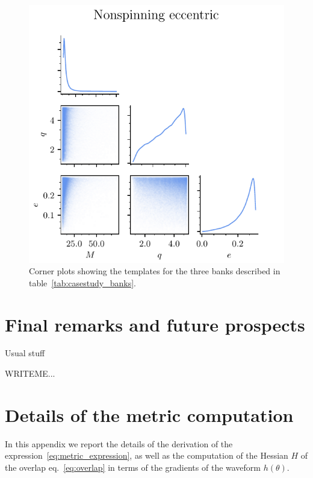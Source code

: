 \documentclass[twocolumn,showpacs,preprintnumbers,nofootinbib,prd,
superscriptaddress,10pt]{revtex4-2}
\begin{document}
\begin{figure}[t]
	\includegraphics{bank_scatter_Nonspinning_eccentric}
	\caption{Corner plots showing the templates for the three banks described in table~\ref{tab:casestudy_banks}. }
	\label{fig:bank_scatter}
\end{figure}

\section{Final remarks and future prospects} \label{sec:conclusion}
Usual stuff
\blindtext
\blindtext
\blindtext
\blindtext
\blindtext
\blindtext
\blindtext

        \begin{acknowledgments}
         
          WRITEME...
        \end{acknowledgments}

\appendix
\section{Details of the metric computation}\label{app:metric}

In this appendix we report the details of the derivation of the expression~\eqref{eq:metric_expression}, as well as the computation of the Hessian $H$ of the overlap eq.~\eqref{eq:overlap} in terms of the gradients of the waveform $h(\theta)$. 
\end{document}
